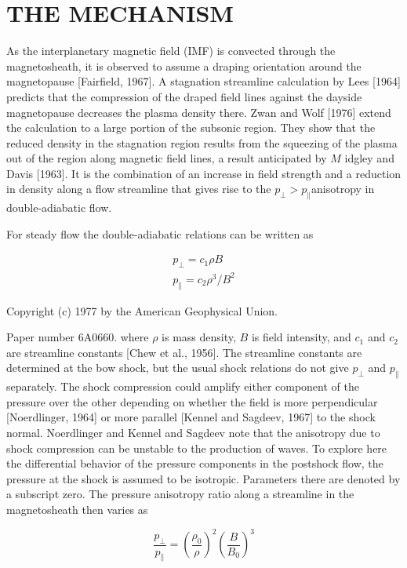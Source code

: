 \documentclass[10pt]{article}
\begin{document}
\section{THE MECHANISM}
As the interplanetary magnetic field (IMF) is convected through the magnetosheath, it is observed to assume a draping orientation around the magnetopause [Fairfield, 1967]. A stagnation streamline calculation by Lees [1964] predicts that the compression of the draped field lines against the dayside magnetopause decreases the plasma density there. Zwan and Wolf [1976] extend the calculation to a large portion of the subsonic region. They show that the reduced density in the stagnation region results from the squeezing of the plasma out of the region along magnetic field lines, a result anticipated by $M$ idgley and Davis [1963]. It is the combination of an increase in field strength and a reduction in density along a flow streamline that gives rise to the $p_{\perp}>p_{\parallel}$anisotropy in double-adiabatic flow.

For steady flow the double-adiabatic relations can be written as

$$
\begin{gathered}
p_{\perp}=c_{1} \rho B \\
p_{\parallel}=c_{2} \rho^{3} / B^{2}
\end{gathered}
$$

Copyright (c) 1977 by the American Geophysical Union.

Paper number 6A0660. where $\rho$ is mass density, $B$ is field intensity, and $c_{1}$ and $c_{2}$ are streamline constants [Chew et al., 1956]. The streamline constants are determined at the bow shock, but the usual shock relations do not give $p_{\perp}$ and $p_{\parallel}$separately. The shock compression could amplify either component of the pressure over the other depending on whether the field is more perpendicular [Noerdlinger, 1964] or more parallel [Kennel and Sagdeev, 1967] to the shock normal. Noerdlinger and Kennel and Sagdeev note that the anisotropy due to shock compression can be unstable to the production of waves. To explore here the differential behavior of the pressure components in the postshock flow, the pressure at the shock is assumed to be isotropic. Parameters there are denoted by a subscript zero. The pressure anisotropy ratio along a streamline in the magnetosheath then varies as

$$
\frac{p_{\perp}}{p_{\parallel}}=\left(\frac{\rho_{0}}{\rho}\right)^{2}\left(\frac{B}{B_{0}}\right)^{3}
$$
\end{document}
